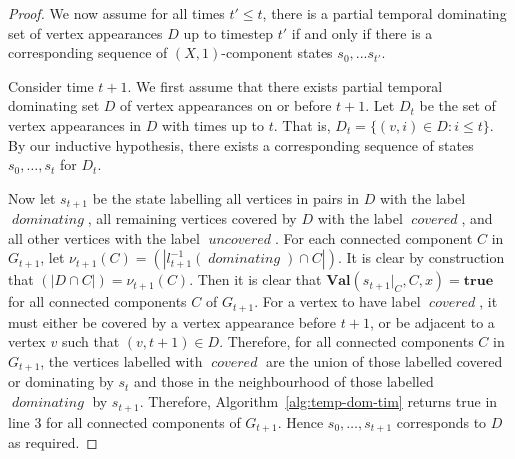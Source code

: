 \documentclass[a4paper,UKenglish,cleveref, autoref, thm-restate]{lipics-v2021} %
\DeclareMathOperator{\covered}{\textit{covered}}
\DeclareMathOperator{\uncovered}{\textit{uncovered}}
\DeclareMathOperator{\dominating}{\textit{dominating}}
\begin{document}
\begin{toappendix}
\begin{proof}
     We now assume for all times $t'\leq t$, there is a partial temporal dominating set of vertex appearances $D$ up to timestep $t'$ if and only if there is a corresponding sequence of $(X,1)$-component states $s_0, ... s_{t'}$.

     Consider time $t+1$. We first assume that there exists partial temporal dominating set $D$ of vertex appearances on or before $t+1$. Let $D_{t}$ be the set of vertex appearances in $D$ with times up to $t$. That is, $D_{t} = \{(v, i) \in D : i \leq t \}$. By our inductive hypothesis, there exists a corresponding sequence of states $s_0,\ldots,s_t$ for $D_t$.
    
     Now let $s_{t+1}$ be the state labelling all vertices in pairs in $D$ with the label $\dominating$, all remaining vertices covered by $D$ with the label $\covered$, and all other vertices with the label $\uncovered$. For each connected component $C$ in $G_{t+1}$, let $\nu_{t+1}(C)=(|l_{t+1}^{-1}(\dominating)\cap C|)$. It is clear by construction that $(|D\cap C|)=\nu_{t+1}(C)$.
     Then it is clear that $\textbf{Val}(s_{t+1}|_C,C,x)=\textbf{true}$ for all connected components $C$ of $G_{t+1}$. For a vertex to have label $\covered$, it must either be covered by a vertex appearance before $t+1$, or be adjacent to a vertex $v$ such that $(v,t+1)\in D$. Therefore, for all connected components $C$ in $G_{t+1}$, the vertices labelled with $\covered$ are the union of those labelled covered or dominating by $s_t$ and those in the neighbourhood of those labelled $\dominating$ by $s_{t+1}$. Therefore, Algorithm~\ref{alg:temp-dom-tim} returns true in line 3 for all connected components of $G_{t+1}$. Hence $s_0,\ldots,s_{t+1}$ corresponds to $D$ as required.
    

\end{proof}
\end{toappendix}
\end{document}

